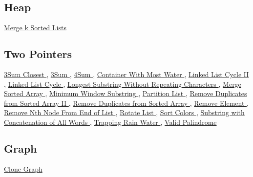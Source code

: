 \documentclass{article}
\begin{document}
\begin{CJK*}{UTF8}{gkai}
\subsection*{ Heap }
\label{ Heap }
\hyperref[ Merge k Sorted Lists ]{ Merge k Sorted Lists }

\subsection*{ Two Pointers }
\label{ Two Pointers }
\hyperref[ 3Sum Closest ]{ 3Sum Closest },
\hyperref[ 3Sum ]{ 3Sum },
\hyperref[ 4Sum ]{ 4Sum },
\hyperref[ Container With Most Water ]{ Container With Most Water },
\hyperref[ Linked List Cycle II ]{ Linked List Cycle II },
\hyperref[ Linked List Cycle ]{ Linked List Cycle },
\hyperref[ Longest Substring Without Repeating Characters ]{ Longest Substring Without Repeating Characters },
\hyperref[ Merge Sorted Array ]{ Merge Sorted Array },
\hyperref[ Minimum Window Substring ]{ Minimum Window Substring },
\hyperref[ Partition List ]{ Partition List },
\hyperref[ Remove Duplicates from Sorted Array II ]{ Remove Duplicates from Sorted Array II },
\hyperref[ Remove Duplicates from Sorted Array ]{ Remove Duplicates from Sorted Array },
\hyperref[ Remove Element ]{ Remove Element },
\hyperref[ Remove Nth Node From End of List ]{ Remove Nth Node From End of List },
\hyperref[ Rotate List ]{ Rotate List },
\hyperref[ Sort Colors ]{ Sort Colors },
\hyperref[ Substring with Concatenation of All Words ]{ Substring with Concatenation of All Words },
\hyperref[ Trapping Rain Water ]{ Trapping Rain Water },
\hyperref[ Valid Palindrome ]{ Valid Palindrome }

\subsection*{ Graph }
\label{ Graph }
\hyperref[ Clone Graph ]{ Clone Graph }


\end{CJK*}
\end{document}
